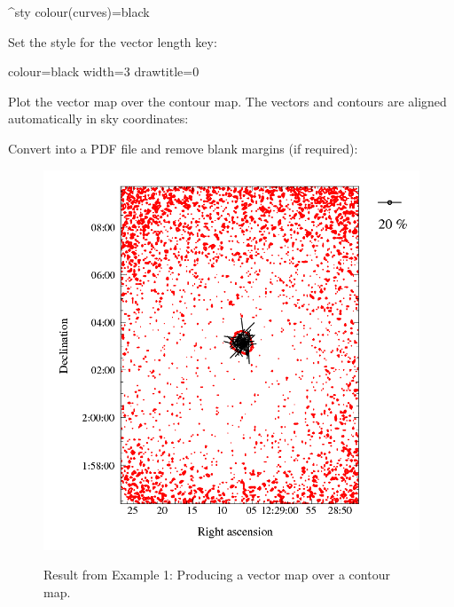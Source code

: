 \begin{terminalv}
^sty
colour(curves)=black
\end{terminalv}


Set the style for the vector length key:


\begin{terminalv}
colour=black
width=3
drawtitle=0
\end{terminalv}

Plot the vector map over the contour map. The vectors and
contours are aligned automatically in sky coordinates:


\begin{terminalv}
\end{terminalv}

Convert into a PDF file and remove blank margins (if required):

\begin{terminalv}
\end{terminalv}

\begin{figure}[t!]
\begin{center}
\includegraphics[width=0.75\linewidth]{sc22-kappa-plots-plot2.png}
\label{fig:kappa-plot2}
\caption [Vector map with contour map in polplot]{
  \small Result from Example 1: Producing a vector map over a contour map. 
}
\end{center}
\end{figure}

